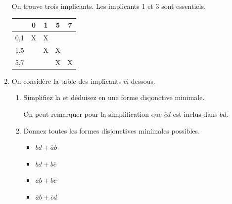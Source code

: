 \documentclass[a4paper,10pt]{exam}
\begin{document}
\begin{enumerate}
\begin{solution}
        On trouve trois implicants. Les implicants 1 et 3 sont essentiels.
        \begin{tabular}{ccccc}
          &0&1&5&7\\
          \hline
       0,1&X&X& & \\
       1,5& &X&X& \\
       5,7& & &X&X\\
        \end{tabular}
      \end{solution}


    \item On considère la table des implicants ci-dessous.
      \begin{enumerate}
        \item Simplifiez la et déduisez en une forme disjonctive minimale.
          \begin{solution}
            On peut remarquer pour la simplification que $\overline{c}d$ est
            inclus dans $bd$.
          \end{solution}
        \item Donnez toutes les formes disjonctives minimales possibles.
          \begin{solution}
            \begin{itemize}
              \item $bd + \overline{a}b$
              \item $bd + b\overline{c}$
              \item $\overline{a}b + b\overline{c}$
              \item $\overline{a}b + \overline{c}d$
            \end{itemize}
          \end{solution}
      \end{enumerate}


\end{enumerate}
\end{document}
